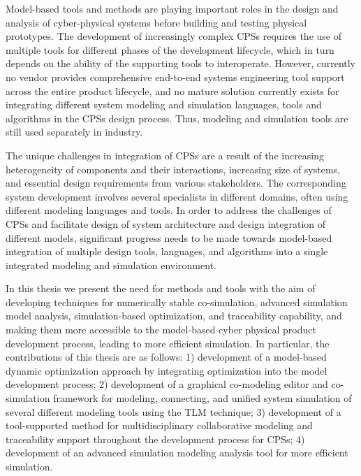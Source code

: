 
Model-based tools and methods are playing important roles in the design and analysis of cyber-physical systems before building and testing physical prototypes. The development of increasingly complex CPSs requires the use of multiple tools for different phases of the development lifecycle, which in turn depends on the ability of the supporting tools to interoperate. However, currently no vendor provides comprehensive end-to-end systems engineering tool support across the entire product lifecycle, and no mature solution currently exists for integrating different system modeling and simulation languages, tools and algorithms in the CPSs design process. Thus, modeling and simulation tools are still used separately in industry. 

The unique challenges in integration of CPSs are a result of the increasing heterogeneity of components and their interactions, increasing size of systems, and essential design requirements from various stakeholders. The corresponding system development involves several specialists in different domains, often using different modeling languages and tools. In order to address the challenges of CPSs and facilitate design of system architecture and design integration of different models, significant progress needs to be made towards model-based integration of multiple design tools, languages, and algorithms into a single integrated modeling and simulation environment. 

In this thesis we present the need for methods and tools with the aim of developing techniques for numerically stable co-simulation, advanced simulation model analysis, simulation-based optimization, and traceability capability, and making them more accessible to the model-based cyber physical product development process, leading to more efficient simulation. In particular, the contributions of this thesis are as follows: 1) development of a model-based dynamic optimization approach by integrating optimization into the model development process; 2) development of a graphical co-modeling editor and co-simulation framework for modeling, connecting, and unified system simulation of several different modeling tools using the TLM technique; 3) development of a tool-supported method for multidisciplinary collaborative modeling and traceability support throughout the development process for CPSs; 4) development of an advanced simulation modeling analysis tool for more efficient simulation.





